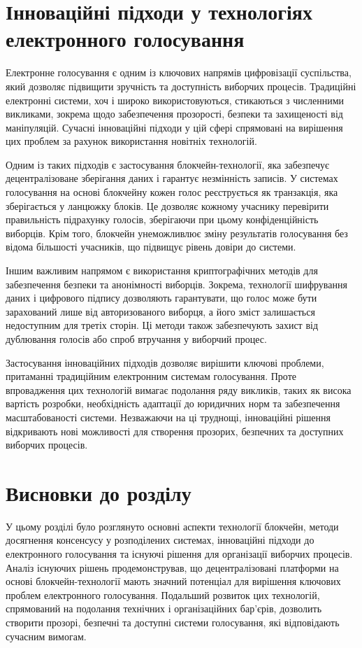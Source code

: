 \documentclass[14pt]{extreport}
\begin{document}
  \section{Інноваційні підходи у технологіях електронного голосування}
  
    Електронне голосування є одним із ключових напрямів цифровізації суспільства, який дозволяє підвищити зручність та доступність виборчих процесів. Традиційні електронні системи, хоч і широко використовуються, стикаються з численними викликами, зокрема щодо забезпечення прозорості, безпеки та захищеності від маніпуляцій. Сучасні інноваційні підходи у цій сфері спрямовані на вирішення цих проблем за рахунок використання новітніх технологій.

  Одним із таких підходів є застосування блокчейн-технології, яка забезпечує децентралізоване зберігання даних і гарантує незмінність записів. У системах голосування на основі блокчейну кожен голос реєструється як транзакція, яка зберігається у ланцюжку блоків. Це дозволяє кожному учаснику перевірити правильність підрахунку голосів, зберігаючи при цьому конфіденційність виборців. Крім того, блокчейн унеможливлює зміну результатів голосування без відома більшості учасників, що підвищує рівень довіри до системи.

  Іншим важливим напрямом є використання криптографічних методів для забезпечення безпеки та анонімності виборців. Зокрема, технології шифрування даних і цифрового підпису дозволяють гарантувати, що голос може бути зарахований лише від авторизованого виборця, а його зміст залишається недоступним для третіх сторін. Ці методи також забезпечують захист від дублювання голосів або спроб втручання у виборчий процес.

  Застосування інноваційних підходів дозволяє вирішити ключові проблеми, притаманні традиційним електронним системам голосування. Проте впровадження цих технологій вимагає подолання ряду викликів, таких як висока вартість розробки, необхідність адаптації до юридичних норм та забезпечення масштабованості системи. Незважаючи на ці труднощі, інноваційні рішення відкривають нові можливості для створення прозорих, безпечних та доступних виборчих процесів.
  
  \section{Висновки до розділу}
  
  У цьому розділі було розглянуто основні аспекти технології блокчейн, методи досягнення консенсусу у розподілених системах, інноваційні підходи до електронного голосування та існуючі рішення для організації виборчих процесів. Аналіз існуючих рішень продемонстрував, що децентралізовані платформи на основі блокчейн-технології мають значний потенціал для вирішення ключових проблем електронного голосування. Подальший розвиток цих технологій, спрямований на подолання технічних і організаційних бар’єрів, дозволить створити прозорі, безпечні та доступні системи голосування, які відповідають сучасним вимогам.
  
\end{document}
